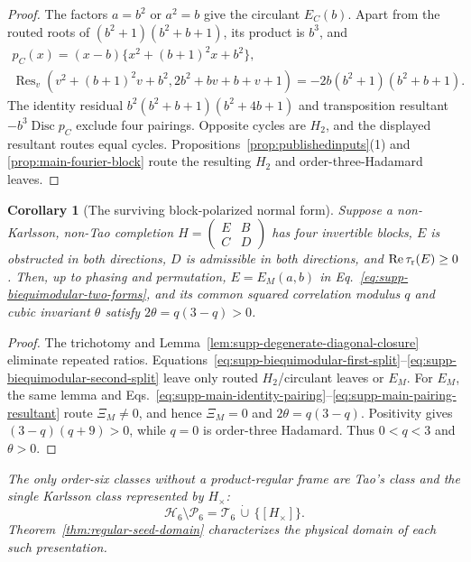 \documentclass[aps,prx,reprint,nofootinbib,twoside,superscriptaddress,longbibliography,floatfix]{revtex4-2}
\newtheorem{corollary}[theorem]{Corollary}
\theoremstyle{definition}
\newcommand{\C}{\mathbb C}
\newcommand{\HH}{\mathcal H}
\newcommand{\RePart}{\operatorname{Re}}
\begin{document}
\begin{proof}
{The factors $a=b^2$ or $a^2=b$ give the circulant $E_C(b)$. Apart from the routed roots of $(b^2+1)(b^2+b+1)$, its product is $b^3$, and}
\begin{equation}
{\begin{gathered}
p_C(x)=(x-b)\{x^2+(b+1)^2x+b^2\},\\
\operatorname{Res}_v\!\left(v^2+(b+1)^2v+b^2,2b^2+bv+b+v+1\right)
=-2b(b^2+1)(b^2+b+1).
\end{gathered}}
\end{equation}
{The identity residual $b^2(b^2+b+1)(b^2+4b+1)$ and transposition resultant $-b^3\operatorname{Disc}p_C$ exclude four pairings. Opposite cycles are $H_2$, and the displayed resultant routes equal cycles. Propositions~\ref{prop:publishedinputs}(1) and \ref{prop:main-fourier-block} route the resulting $H_2$ and order-three-Hadamard leaves.}
\end{proof}


\begin{corollary}[The surviving block-polarized normal form]
\label{cor:supp-block-polarized-normal-form}
{Suppose a non-Karlsson, non-Tao completion $H=\left(\begin{smallmatrix}E&B\\C&D\end{smallmatrix}\right)$ has four invertible blocks, $E$ is obstructed in both directions, $D$ is admissible in both directions, and $\RePart\tau_{\rm r}(E)\ge0$.  Then, up to phasing and permutation, $E=E_M(a,b)$ in Eq.~\eqref{eq:supp-biequimodular-two-forms}, and its common squared correlation modulus $q$ and cubic invariant $\theta$ satisfy $2\theta=q(3-q)>0$.}
\end{corollary}

\begin{proof}
{The trichotomy and Lemma~\ref{lem:supp-degenerate-diagonal-closure} eliminate repeated ratios.  Equations~\eqref{eq:supp-biequimodular-first-split}--\eqref{eq:supp-biequimodular-second-split} leave only routed $H_2$/circulant leaves or $E_M$.  For $E_M$, the same lemma and Eqs.~\eqref{eq:supp-main-identity-pairing}--\eqref{eq:supp-main-pairing-resultant} route $\Xi_M\ne0$, and hence $\Xi_M=0$ and $2\theta=q(3-q)$. Positivity gives $(3-q)(q+9)>0$, while $q=0$ is order-three Hadamard. Thus $0<q<3$ and $\theta>0$.}
\end{proof}

{\emph{The only order-six classes without a product-regular frame are Tao's class and the single Karlsson class represented by $H_\times$:}}
\begin{equation}
{\HH_6\setminus\mathcal P_6
=\mathcal T_6\,\dot\cup\,\{[H_\times]\}.}
\label{eq:supp-global-product-regular-reach}
\end{equation}
{\emph{Theorem~\ref{thm:regular-seed-domain} characterizes the physical domain of each such presentation.}}
\end{document}
